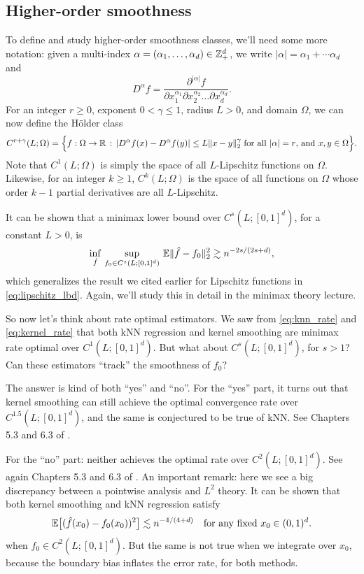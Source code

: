 \documentclass{article}
\begin{document}
\subsection{Higher-order smoothness}

To define and study higher-order smoothness classes, we'll need some more
notation: given a multi-index $\alpha=(\alpha_1,\dots,\alpha_d) \in \mathbb{Z}^d_+$, we
write  $|\alpha| = \alpha_1 + \cdots \alpha_d$ and 
\[
D^\alpha f = \frac{\partial^{|\alpha|} f}{\partial x_1^{\alpha_1} \partial
  x_2^{\alpha_2} \dots \partial x_d^{\alpha_d}}.
\]
For an integer $r \geq 0$, exponent $0 < \gamma \leq 1$, radius $L>0$, and
domain $\Omega$, we can now define the H{\"o}lder class
\[
C^{r+\gamma}(L; \Omega) = \Big\{ f : \Omega \to \mathbb{R} \,:\, | D^\alpha f (x) -
D^\alpha f(y) | \leq L \|x-y\|_2^\gamma \; \text{for all $|\alpha| = r$, and
  $x,y \in \Omega$} \Big\}. 
\]
Note that $C^1(L; \Omega)$ is simply the space of all $L$-Lipschitz functions on
$\Omega$. Likewise, for an integer $k \geq 1$, $C^k(L; \Omega)$ is the space of
all functions on $\Omega$ whose order $k-1$ partial derivatives are all
$L$-Lipschitz. 

It can be shown that a minimax lower bound over $C^s(L; [0,1]^d)$, for a
constant $L>0$, is    
\begin{equation}
\label{eq:holder_lbd}
\inf_{\hat{f}} \, \sup_{f_0 \in C^s(L; [0,1]^d)} \, \mathbb{E}\|\hat{f} - f_0\|_2^2   
\gtrsim n^{-2s/(2s+d)},
\end{equation}
which generalizes the result we cited earlier for Lipschitz functions in
\eqref{eq:lipschitz_lbd}. Again, we'll study this in detail in the minimax
theory lecture. 

So now let's think about rate optimal estimators. We saw from
\eqref{eq:knn_rate} and \eqref{eq:kernel_rate} that both kNN regression and
kernel smoothing are minimax rate optimal over $C^1(L; [0,1]^d)$. But what about
$C^s(L; [0,1]^d)$, for $s>1$? Can these estimators ``track'' the smoothness of
$f_0$? 

The answer is kind of both ``yes'' and ``no''. For the ``yes'' part, it turns
out that kernel smoothing can still achieve the optimal convergence rate over   
$C^{1.5}(L; [0,1]^d)$, and the same is conjectured to be true of kNN. See
Chapters 5.3 and 6.3 of \citet{gyorfi2002distribution}.

For the ``no'' part: neither achieves the optimal rate over $C^2(L;
[0,1]^d)$. See again Chapters 5.3 and 6.3 of \citet{gyorfi2002distribution}. An
important remark: here we see a big discrepancy between a pointwise analysis and
$L^2$ theory. It can be shown that both kernel smoothing and kNN regression
satisfy   
\[
\mathbb{E}\big[ (\hat{f}(x_0) - f_0(x_0))^2 \big] \lesssim n^{-4/(4+d)} \quad \text{for any
  fixed $x_0 \in (0,1)^d$}.   
\]
when $f_0 \in C^2(L; [0,1]^d)$. But the same is not true when we integrate over
$x_0$, because the boundary bias inflates the error rate, for both methods.  
\end{document}
